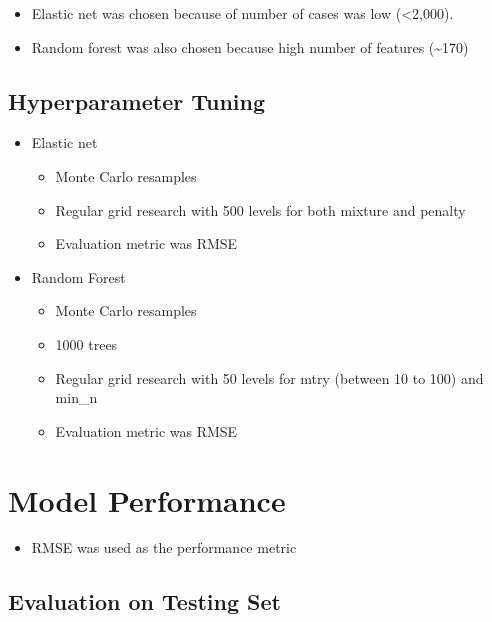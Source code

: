 \documentclass[sn-basic,pdflatex]{sn-jnl}
\providecommand{\tightlist}{%
  \setlength{\itemsep}{0pt}\setlength{\parskip}{0pt}}
\begin{document}
\begin{itemize}
\tightlist
\item
  Elastic net was chosen because of number of cases was low
  (\textless2,000).
\item
  Random forest was also chosen because high number of features
  (\textasciitilde170)
\end{itemize}

\subsection{Hyperparameter Tuning}\label{hyperparameter-tuning}

\begin{itemize}
\tightlist
\item
  Elastic net

  \begin{itemize}
  \tightlist
  \item
    Monte Carlo resamples
  \item
    Regular grid research with 500 levels for both mixture and penalty
  \item
    Evaluation metric was RMSE
  \end{itemize}
\item
  Random Forest

  \begin{itemize}
  \tightlist
  \item
    Monte Carlo resamples
  \item
    1000 trees
  \item
    Regular grid research with 50 levels for mtry (between 10 to 100)
    and min\_n
  \item
    Evaluation metric was RMSE
  \end{itemize}
\end{itemize}

\section{Model Performance}\label{model-performance}

\begin{itemize}
\tightlist
\item
  RMSE was used as the performance metric
\end{itemize}

\subsection{Evaluation on Testing Set}\label{evaluation-on-testing-set}
\end{document}
